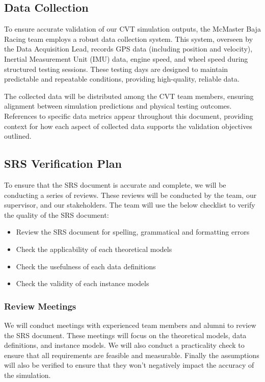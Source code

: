 \documentclass[12pt, titlepage]{article}
\begin{document}
\subsection{Data Collection}

\noindent To ensure accurate validation of our CVT simulation outputs, the McMaster Baja Racing team employs a robust data collection system. This system, overseen by the Data Acquisition Lead, records GPS data (including position and velocity), Inertial Measurement Unit (IMU) data, engine speed, and wheel speed during structured testing sessions. These testing days are designed to maintain predictable and repeatable conditions, providing high-quality, reliable data.

The collected data will be distributed among the CVT team members, ensuring alignment between simulation predictions and physical testing outcomes. References to specific data metrics appear throughout this document, providing context for how each aspect of collected data supports the validation objectives outlined.
\subsection{SRS Verification Plan}

\noindent To ensure that the SRS document is accurate and complete, we will be conducting a series of reviews.
These reviews will be conducted by the team, our supervisor, and our stakeholders.
The team will use the below checklist to verify the quality of the SRS document:
\begin{itemize}
  \item Review the SRS document for spelling, grammatical and formatting errors
  \item Check the applicability of each theoretical models
  \item Check the usefulness of each data definitions
  \item Check the validity of each instance models
\end{itemize}

\subsubsection*{Review Meetings}
We will conduct meetings with experienced team members and alumni to review the SRS document.
These meetings will focus on the theoretical models, data definitions, and instance models.
We will also conduct a practicality check to ensure that all requirements are feasible and measurable.
Finally the assumptions will also be verified to ensure that they won't negatively impact the accuracy of the simulation.
\end{document}
